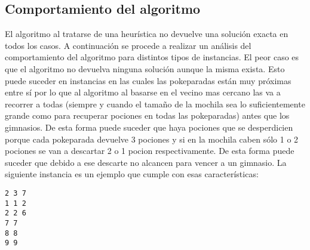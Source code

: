       \subsection{Comportamiento del algoritmo}
      El algoritmo al tratarse de una heurística no devuelve una solución exacta en todos los casos. A continuación se procede a realizar un análisis del comportamiento del algoritmo para distintos tipos de instancias. El peor caso es que el algoritmo no devuelva ninguna solución aunque la misma exista. Esto puede suceder en instancias en las cuales las pokeparadas están muy próximas entre sí por lo que al algoritmo al basarse en el vecino mas cercano las va a recorrer a todas (siempre y cuando el tamaño de la mochila sea lo suficientemente grande como para recuperar pociones en todas las pokeparadas) antes que los gimnasios. De esta forma puede suceder que haya pociones que se desperdicien porque cada pokeparada devuelve 3 pociones y si en la mochila caben sólo 1 o 2 pociones se van a descartar 2 o 1 pocion respectivamente. De esta forma puede suceder que debido a ese descarte no alcancen para vencer a un gimnasio. La siguiente instancia es un ejemplo que cumple con esas características: 

      \begin{codesnippet}
            \begin{verbatim}
2 3 7
1 1 2
2 2 6
7 7
8 8
9 9

\end{verbatim}
            \end{codesnippet}